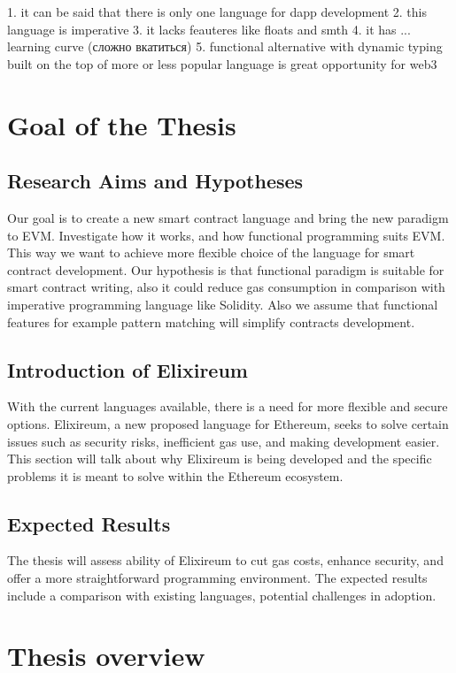 1. it can be said that there is only one language for dapp development
2. this language is imperative 
3. it lacks feauteres like floats and smth
4. it has ... learning curve (сложно вкатиться)
5. functional alternative with dynamic typing built on the top of more or less popular language is great opportunity for web3

\section{Goal of the Thesis}


\subsection{Research Aims and Hypotheses}
Our goal is to create a new smart contract language and bring the new paradigm to EVM. Investigate how it works, and how functional programming suits EVM. This way we want to achieve more flexible choice of the language for smart contract development.
Our hypothesis is that functional paradigm is suitable for smart contract writing, also it could reduce gas consumption in comparison with imperative programming language like Solidity. Also we assume that functional features for example pattern matching will simplify contracts development.

\subsection{Introduction of Elixireum}
With the current languages available, there is a need for more flexible and secure options. Elixireum, a new proposed language for Ethereum, seeks to solve certain issues such as security risks, inefficient gas use, and making development easier. This section will talk about why Elixireum is being developed and the specific problems it is meant to solve within the Ethereum ecosystem.

\subsection{Expected Results}
The thesis will assess ability of Elixireum to cut gas costs, enhance security, and offer a more straightforward programming environment. The expected results include a comparison with existing languages, potential challenges in adoption.

\section{Thesis overview}



